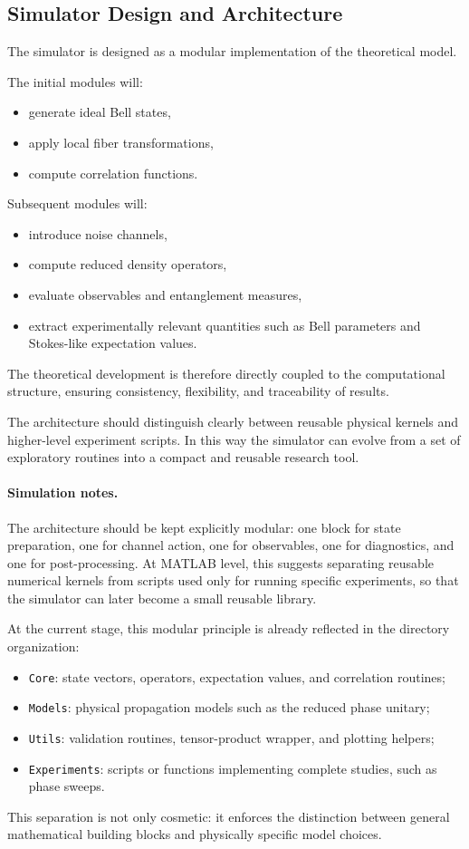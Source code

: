 \documentclass[a4paper]{article}
\begin{document}
\subsection{Simulator Design and Architecture}

The simulator is designed as a modular implementation of the theoretical model.

The initial modules will:
\begin{itemize}
    \item generate ideal Bell states,
    \item apply local fiber transformations,
    \item compute correlation functions.
\end{itemize}

Subsequent modules will:
\begin{itemize}
    \item introduce noise channels,
    \item compute reduced density operators,
    \item evaluate observables and entanglement measures,
    \item extract experimentally relevant quantities such as Bell parameters and Stokes-like expectation values.
\end{itemize}

The theoretical development is therefore directly coupled to the computational structure, ensuring consistency, flexibility, and traceability of results.

The architecture should distinguish clearly between reusable physical kernels and higher-level experiment scripts. In this way the simulator can evolve from a set of exploratory routines into a compact and reusable research tool.

\paragraph{Simulation notes.}
The architecture should be kept explicitly modular: one block for state preparation, one for channel action, one for observables, one for diagnostics, and one for post-processing. At MATLAB level, this suggests separating reusable numerical kernels from scripts used only for running specific experiments, so that the simulator can later become a small reusable library.

At the current stage, this modular principle is already reflected in the directory organization:
\begin{itemize}
    \item \texttt{Core}: state vectors, operators, expectation values, and correlation routines;
    \item \texttt{Models}: physical propagation models such as the reduced phase unitary;
    \item \texttt{Utils}: validation routines, tensor-product wrapper, and plotting helpers;
    \item \texttt{Experiments}: scripts or functions implementing complete studies, such as phase sweeps.
\end{itemize}
This separation is not only cosmetic: it enforces the distinction between general mathematical building blocks and physically specific model choices.
\end{document}
